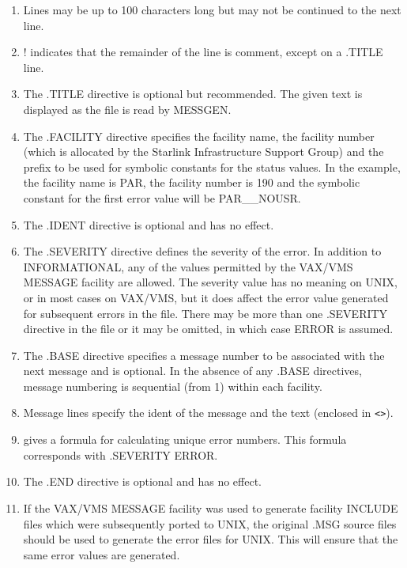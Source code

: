 \begin{enumerate}
\item Lines may be up to 100 characters long but may not be continued to the
next line.
\item ! indicates that the remainder
of the line is comment, except on a .TITLE line.
\item The .TITLE directive is optional but recommended. The given text is 
displayed as the file is read by MESSGEN.
\item The .FACILITY directive specifies the facility name, the facility number
(which is allocated by the Starlink Infrastructure Support Group) and the
prefix to be used for symbolic constants for the status values. 
In the example, the facility name is PAR, the facility number is 190 and the
symbolic constant for the first error value will be PAR\_\_NOUSR.
\item The .IDENT directive is optional and has no effect.
\item The .SEVERITY directive defines the severity of the error. In addition
to INFORMATIONAL, any of the values permitted by the VAX/VMS MESSAGE facility
are allowed.
The severity value has no meaning on UNIX, or in most cases on VAX/VMS, but 
it does affect the error value generated for subsequent errors in the file. 
There may be more than one .SEVERITY directive in the file or it may be omitted,
in which case ERROR is assumed.
\item The .BASE directive specifies a message number to be associated with 
the next message and is optional. 
In the absence of any .BASE directives, message numbering is sequential
(from 1) within each facility.
\item Message lines specify the ident of the message and the text 
(enclosed in \verb!<>!).
\item 
{} 
gives a formula for calculating unique error numbers. This formula
corresponds with .SEVERITY ERROR. 
\item The .END directive is optional and has no effect.
\item If the VAX/VMS MESSAGE facility was used to generate facility INCLUDE
files which were subsequently ported to UNIX, the original 
.MSG source files should be used to generate the error files for UNIX. This
will ensure that the same error values are generated.
\end{enumerate}

